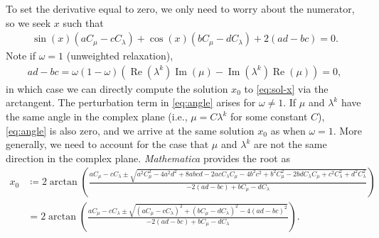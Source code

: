 \documentclass[VANCOUVER,STIX1COL]{WileyNJD-v2}
\newcommand{\Rea}{\operatorname{Re}}
\newcommand{\Ima}{\operatorname{Im}}
\begin{document}
%
To set the derivative equal to zero, we only need to worry about the numerator,
so we seek $x$ such that
%
\begin{align}\label{eq:sol-x}
\sin(x)(aC_\mu - cC_\lambda) + \cos(x)(bC_\mu - dC_\lambda) + 2(ad -bc) = 0.
\end{align}
%
Note if $\omega = 1$ (unweighted relaxation),
%
\begin{align}\label{eq:angle}
ad - bc = \omega(1-\omega)(\Rea(\lambda^k)\Ima(\mu) - \Ima(\lambda^k)\Rea(\mu)) = 0,
\end{align}
%
in which case we can directly compute the solution $x_0$ to \eqref{eq:sol-x}
via the arctangent. The perturbation term in \eqref{eq:angle} arises for
$\omega \neq 1$. If $\mu$ and $\lambda^k$ have the same angle in the complex plane
(i.e., $\mu = C\lambda^k$ for some constant $C$), \eqref{eq:angle} is also
zero, and we arrive at the same solution $x_0$ as when $\omega = 1$. More
generally, we need to account for the case that $\mu$ and $\lambda^k$ are
not the same direction in the complex plane. \emph{Mathematica} provides
the root as
%
\begin{align}\nonumber
x_0 & \coloneqq 2\arctan\left(\frac{a C_\mu - c C_\lambda \pm \sqrt{a^2 C_\mu^2 - 4 a^2 d^2 + 8 a b c d - 2 a c C_\lambda C_\mu - 4 b^2 c^2 + b^2 C_\mu^2 - 2 bd C_\lambda C_\mu + c^2 C_\lambda^2 + d^2C_\lambda^2 }}{-2(a d - b c) + b C_\mu - dC_\lambda}\right) \\
& = 2\arctan\left(\frac{a C_\mu - c C_\lambda \pm \sqrt{(aC_\mu - cC_\lambda)^2 + 
	(bC_\mu - dC_\lambda)^2 - 4(ad-bc)^2}}{-2(a d - b c) + b C_\mu - dC_\lambda}\right).\label{eq:max}
\end{align}
%
\end{document}
